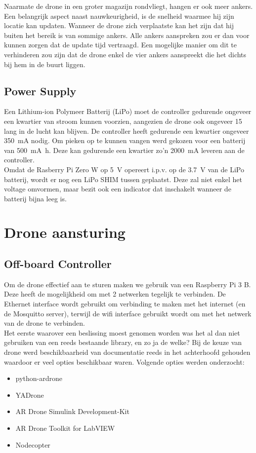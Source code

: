 Naarmate de drone in een groter magazijn rondvliegt, hangen er ook meer ankers.
Een belangrijk aspect naast nauwkeurigheid, is de snelheid waarmee hij zijn locatie kan updaten.
Wanneer de drone zich verplaatste kan het zijn dat hij buiten het bereik is van sommige ankers.
Alle ankers aanspreken zou er dan voor kunnen zorgen dat de update tijd vertraagd.
Een mogelijke manier om dit te verhinderen zou zijn dat de drone enkel de vier ankers aanspreekt die het dichts bij hem in de buurt liggen.

\subsection{Power Supply} \label{sec:power_supply}
Een Lithium-ion Polymeer Batterij (LiPo) moet de controller gedurende ongeveer een kwartier van stroom kunnen voorzien, aangezien de drone ook ongeveer \SI{15}{\min} lang in de lucht kan blijven.
De controller heeft gedurende een kwartier ongeveer \SI{350}{\mA} nodig.
Om pieken op te kunnen vangen werd gekozen voor een batterij van \SI{500}{\mA\hour}. Deze kan gedurende een kwartier zo'n \SI{2000}{\mA} leveren aan de controller.\\

Omdat de Rasberry Pi Zero W op \SI{5}{\V} opereert i.p.v. op de \SI{3.7}{\V} van de LiPo batterij, wordt er nog een LiPo SHIM tussen geplaatst.
Deze zal niet enkel het voltage omvormen, maar bezit ook een indicator dat inschakelt wanneer de batterij bijna leeg is.

\section{Drone aansturing} \label{sec:drone_control}
\subsection{Off-board Controller} \label{sec:offboard_controller}
Om de drone effectief aan te sturen maken we gebruik van een Raspberry Pi 3 B.
Deze heeft de mogelijkheid om met 2 netwerken tegelijk te verbinden.
De Ethernet interface wordt gebruikt om verbinding te maken met het internet (en de Mosquitto server), terwijl de wifi interface gebruikt wordt om met het netwerk van de drone te verbinden.\\

Het eerste waarover een beslissing moest genomen worden was het al dan niet gebruiken van een reeds bestaande library, en zo ja de welke?
Bij de keuze van drone werd beschikbaarheid van documentatie reeds in het achterhoofd gehouden waardoor er veel opties beschikbaar waren.
Volgende opties werden onderzocht:
\begin{itemize}
\item python-ardrone
\item YADrone
\item AR Drone Simulink Development-Kit
\item AR Drone Toolkit for LabVIEW
\item Nodecopter
\end{itemize}

